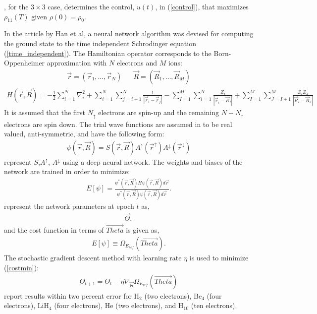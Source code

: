 \documentclass[]{article}
\begin{document}
\cite{grivopoulos2005optimal}, for the $3\times 3$ case,
determines the control, $u(t)$, in
(\ref{control}), that maximizes $\rho_{11}(T)$ given $\rho(0)=\rho_{0}$.
\par\noindent
In the article by Han et al\cite{HAN2019108929}, a neural network 
algorithm was devised for computing the ground state to the 
time independent Schrodinger equation (\ref{time_independent}).
The Hamiltonian operator corresponds to the Born-Oppenheimer 
approximation\cite{https://doi.org/10.1002/andp.19273892002}
with $N$ electrons and $M$ ions:
\begin{eqnarray}
\vec{r}=(\vec{r}_{1},\ldots,\vec{r}_{N}) \hspace{20pt}
\vec{R}=(\vec{R}_{1},\ldots,\vec{R}_{M})
\end{eqnarray}
\begin{eqnarray}
H(\vec{r},\vec{R})=
-\frac{1}{2}\sum_{i=1}^{N}\nabla_{i}^{2}+
\sum_{i=1}^{N}\sum_{j=i+1}^{N}\frac{1}{|\vec{r}_{i}-\vec{r}_{j}|}-
\sum_{I=1}^{M}\sum_{i=1}^{N}\frac{Z_{I}}{|\vec{r}_{i}-\vec{R}_{I}|}+
\sum_{I=1}^{M}\sum_{J=I+1}^{M}\frac{Z_{I}Z_{J}}{|\vec{R}_{I}-\vec{R}_{J}|}
\end{eqnarray}
It is assumed that the first $N_{\uparrow}$ electrons are spin-up and the
remaining $N-N_{\uparrow}$ electrons are spin down\cite{foulkes2001quantum}.
The trial wave functions are assumed in \cite{HAN2019108929} to be 
real valued, anti-symmetric, and have the following form:
\begin{eqnarray}
\psi(\vec{r},\vec{R})=S(\vec{r},\vec{R})
 A^{\uparrow}(\vec{r}^{\uparrow})A^{\downarrow}(\vec{r}^{\downarrow})
\end{eqnarray}
\cite{HAN2019108929} represent $S$,$A^{\uparrow}$, $A^{\downarrow}$ using
a deep neural network.  The weights and biases of the network are
trained in order to minimize:
\begin{eqnarray}
E[\psi]=\frac{\psi^{\ast}(\vec{r},\vec{R})H\psi(\vec{r},\vec{R})d\vec{r}}
    {\psi^{\ast}(\vec{r},\vec{R})\psi(\vec{r},\vec{R})d\vec{r}}.
\end{eqnarray}
\cite{HAN2019108929} represent the network parameters at epoch $t$ as,
\begin{eqnarray}
\vec{\Theta},
\end{eqnarray}
and the cost function in terms of $\vec{Theta}$ is given as,
\begin{eqnarray}
E[\psi]\equiv \Omega_{E_{ref}}(\vec{Theta}). \label{costmin}
\end{eqnarray}
The stochastic gradient descent method with learning
rate $\eta$ is used to minimize (\ref{costmin}):
\begin{eqnarray}
\Theta_{t+1}=\Theta_{t}-\eta\nabla_{\vec{\Theta}} \Omega_{E_{ref}}(\vec{Theta})
\end{eqnarray}
\cite{HAN2019108929} report results within two percent error for 
$\mbox{H}_{2}$ (two electrons), 
$\mbox{Be}_{4}$ (four electrons), 
$\mbox{LiH}_{4}$ (four electrons), 
$\mbox{He}$ (two electrons), and
$\mbox{H}_{10}$ (ten electrons).
\end{document}
